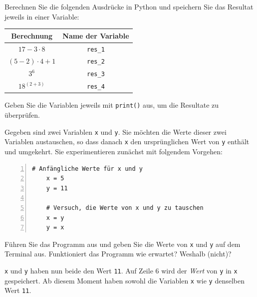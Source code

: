 \begin{myexercise}\label{ex:arithm-ausdruecke}
	Berechnen Sie die folgenden Ausdrücke in Python und speichern Sie das Resultat jeweils in einer Variable:
	\begin{table}[H]
		\centering
		\begin{tabular}{cc}
			Berechnung          & Name der Variable \\\midrule
			$17 - 3 \cdot 8$    & \lstinline|res_1| \\\midrule
			$(5-2) \cdot 4 + 1$ & \lstinline|res_2| \\\midrule
			$3^6$               & \lstinline|res_3| \\\midrule
			$18^{(2+3)}$        & \lstinline|res_4|
		\end{tabular}
	\end{table}
	Geben Sie die Variablen jeweils mit \lstinline|print()| aus, um die Resultate zu überprüfen.
	\begin{myanswer}
		
	\end{myanswer}
\end{myexercise}

\begin{myexercise}\label{ex:austausch}
	Gegeben sind zwei Variablen \lstinline|x| und \lstinline|y|. Sie möchten die Werte dieser zwei Variablen austauschen, so dass danach \lstinline|x| den ursprünglichen Wert von \lstinline|y| enthält und umgekehrt. Sie experimentieren zunächst mit folgendem Vorgehen:
	\begin{lstlisting}[numbers=left]
	# Anfängliche Werte für x und y
	x = 5
	y = 11

	# Versuch, die Werte von x und y zu tauschen
	x = y
	y = x
\end{lstlisting}
	Führen Sie das Programm aus und geben Sie die Werte von \lstinline|x| und \lstinline|y| auf dem Terminal aus. Funktioniert das Programm wie erwartet? Weshalb (nicht)?
	\begin{myanswer}
		\lstinline|x| und \lstinline|y| haben nun beide den Wert \lstinline|11|. Auf Zeile 6 wird der \emph{Wert} von \lstinline|y| in \lstinline|x| gespeichert. Ab diesem Moment haben sowohl die Variablen \lstinline|x| wie \lstinline|y| denselben Wert \lstinline|11|.
	\end{myanswer}
\end{myexercise}

